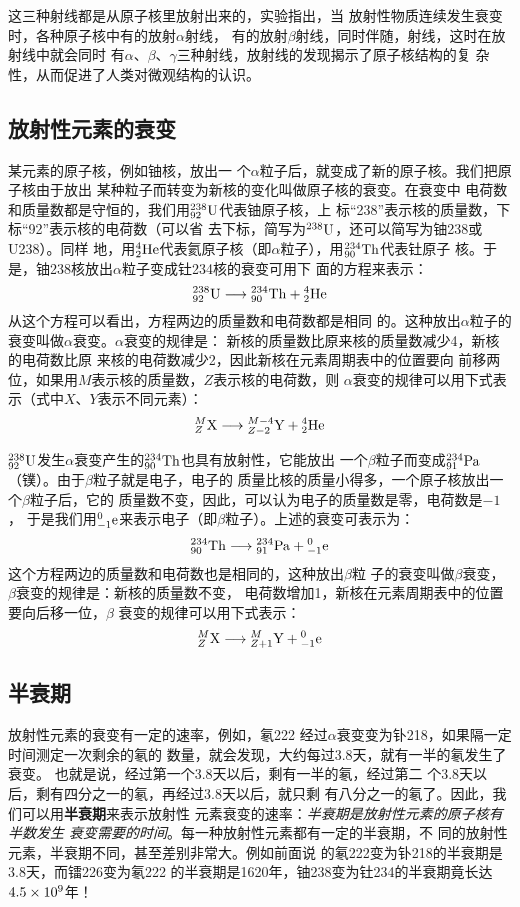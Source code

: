 这三种射线都是从原子核里放射出来的，实验指出，当
放射性物质连续发生衰变时，各种原子核中有的放射$\alpha$射线，
有的放射$\beta$射线，同时伴随，射线，这时在放射线中就会同时
有$\alpha$、$\beta$、$\gamma$三种射线，放射线的发现揭示了原子核结构的复
杂性，从而促进了人类对微观结构的认识。

\subsection{放射性元素的衰变}

某元素的原子核，例如铀核，放出一
个$\alpha$粒子后，就变成了新的原子核。我们把原子核由于放出
某种粒子而转变为新核的变化叫做原子核的衰变。在衰变中
电荷数和质量数都是守恒的，我们用$\atom{U}{238}{92}$代表铀原子核，上
标“238”表示核的质量数，下标“92”表示核的电荷数（可以省
去下标，简写为$\atom{U}{238}{}$，还可以简写为铀238或U238）。同样
地，用$\atom{He}{4}{2}$代表氦原子核（即$\alpha$粒子），用$\atom{Th}{234}{90}$代表钍原子
核。于是，铀238核放出$\alpha$粒子变成钍234核的衰变可用下
面的方程来表示：
\[\atom{U}{238}{92}\longrightarrow \atom{Th}{234}{90}+\atom{He}{4}{2}\]
从这个方程可以看出，方程两边的质量数和电荷数都是相同
的。这种放出$\alpha$粒子的衰变叫做$\alpha$衰变。$\alpha$衰变的规律是：
新核的质量数比原来核的质量数减少4，新核的电荷数比原
来核的电荷数减少2，因此新核在元素周期表中的位置要向
前移两位，如果用$M$表示核的质量数，$Z$表示核的电荷数，则
$\alpha$衰变的规律可以用下式表示（式中$X$、$Y$表示不同元素）：
\[\atom{X}{M}{Z}\longrightarrow \atom{Y}{M-4}{Z-2}+\atom{He}{4}{2}   \]

$\atom{U}{238}{92}$发生$\alpha$衰变产生的$\atom{Th}{234}{90}$也具有放射性，它能放出
一个$\beta$粒子而变成$\atom{Pa}{234}{91}$（镤）。由于$\beta$粒子就是电子，电子的
质量比核的质量小得多，一个原子核放出一个$\beta$粒子后，它的
质量数不变，因此，可以认为电子的质量数是零，电荷数是$-1$，
于是我们用$\atom{e}{0}{-1}$来表示电子（即$\beta$粒子）。上述的衰变可表示为：
\[\atom{Th}{234}{90}\longrightarrow \atom{Pa}{234}{91}+ \atom{e}{0}{-1}\]
这个方程两边的质量数和电荷数也是相同的，这种放出$\beta$粒
子的衰变叫做$\beta$衰变，$\beta$衰变的规律是：新核的质量数不变，
电荷数增加1，新核在元素周期表中的位置要向后移一位，$\beta$
衰变的规律可以用下式表示：
\[\atom{X}{M}{Z}\longrightarrow \atom{Y}{M}{Z+1}+ \atom{e}{0}{-1}\]



\subsection{半衰期}
放射性元素的衰变有一定的速率，例如，氡222
经过$\alpha$衰变变为钋218，如果隔一定时间测定一次剩余的氡的
数量，就会发现，大约每过3.8天，就有一半的氡发生了衰变。
也就是说，经过第一个3.8天以后，剩有一半的氡，经过第二
个3.8天以后，剩有四分之一的氡，再经过3.8天以后，就只剩
有八分之一的氡了。因此，我们可以用\textbf{半衰期}来表示放射性
元素衰变的速率：\textit{半衰期是放射性元素的原子核有半数发生
衰变需要的时间}。每一种放射性元素都有一定的半衰期，不
同的放射性元素，半衰期不同，甚至差别非常大。例如前面说
的氡222变为钋218的半衰期是3.8天，而镭226变为氡222
的半衰期是1620年，铀238变为钍234的半衰期竟长达$4.5
\x10^9$年！


